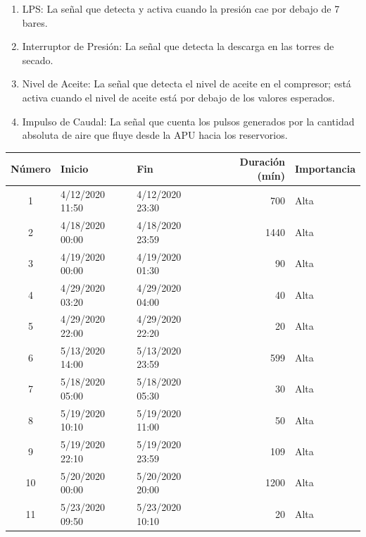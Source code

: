 \documentclass[12pt,letterpaper]{article}
\begin{document}
\begin{enumerate}
    \item LPS: La señal que detecta y activa cuando la presión cae por debajo de 7 bares.
    \item Interruptor de Presión: La señal que detecta la descarga en las torres de secado.
    \item Nivel de Aceite: La señal que detecta el nivel de aceite en el compresor; está activa cuando el nivel de aceite está por debajo de los valores esperados.
    \item Impulso de Caudal: La señal que cuenta los pulsos generados por la cantidad absoluta de aire que fluye desde la APU hacia los reservorios.
\end{enumerate}

\begin{table}[htp]
    \centering
\begin{tabular}{cllrl}
\hline
\textbf{Número} & \textbf{Inicio}       & \textbf{Fin}         & \textbf{Duración (mín)} & \textbf{Importancia} \\ \hline
1            & 4/12/2020 11:50          & 4/12/2020 23:30           & 700                & Alta              \\
2            & 4/18/2020 00:00          & 4/18/2020 23:59           & 1440               & Alta              \\
3            & 4/19/2020 00:00          & 4/19/2020 01:30           & 90                 & Alta              \\
4            & 4/29/2020 03:20          & 4/29/2020 04:00           & 40                 & Alta              \\
5            & 4/29/2020 22:00          & 4/29/2020 22:20           & 20                 & Alta              \\
6            & 5/13/2020 14:00          & 5/13/2020 23:59           & 599                & Alta              \\
7            & 5/18/2020 05:00          & 5/18/2020 05:30           & 30                 & Alta              \\
8            & 5/19/2020 10:10          & 5/19/2020 11:00           & 50                 & Alta              \\
9            & 5/19/2020 22:10          & 5/19/2020 23:59           & 109                & Alta              \\
10           & 5/20/2020 00:00          & 5/20/2020 20:00           & 1200               & Alta              \\
11           & 5/23/2020 09:50          & 5/23/2020 10:10           & 20                 & Alta              \\

\end{tabular}
\end{table}
\end{document}
